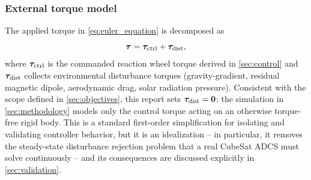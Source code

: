 \subsubsection{External torque model}

The applied torque in \cref{eq:euler_equation} is decomposed as
\begin{equation}
    \bm{\tau} = \bm{\tau}_{\text{ctrl}} + \bm{\tau}_{\text{dist}},
    \label{eq:torque_decomp}
\end{equation}
where $\bm{\tau}_{\text{ctrl}}$ is the commanded reaction wheel torque derived in \cref{sec:control} and $\bm{\tau}_{\text{dist}}$ collects environmental disturbance torques (gravity-gradient, residual magnetic dipole, aerodynamic drag, solar radiation pressure). Consistent with the scope defined in \cref{sec:objectives}, this report sets $\bm{\tau}_{\text{dist}} = \bm{0}$: the simulation in \cref{sec:methodology} models only the control torque acting on an otherwise torque-free rigid body. This is a standard first-order simplification for isolating and validating controller behavior, but it is an idealization -- in particular, it removes the steady-state disturbance rejection problem that a real CubeSat ADCS must solve continuously -- and its consequences are discussed explicitly in \cref{sec:validation}.
